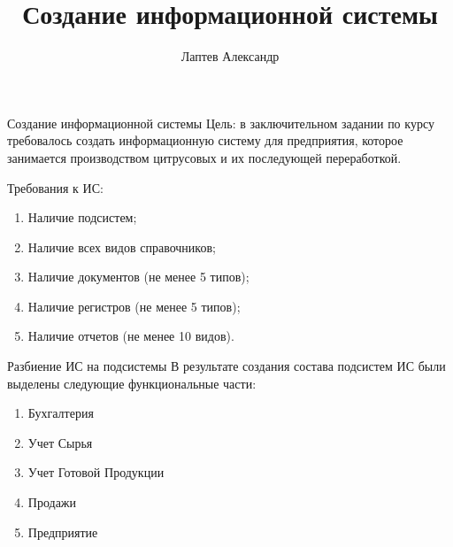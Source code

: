 \documentclass[12pt,a4paper,mathserif]{beamer}
\author{Лаптев Александр}
\title{Создание информационной системы}
\begin{document}
\begin{frame}
\maketitle
\end{frame}

\begin{frame}{Создание информационной системы}
    \setlength{\parindent}{0.5cm}
    Цель: в заключительном задании по курсу требовалось создать информационную систему для предприятия, которое занимается производством цитрусовых и их последующей переработкой.
    
    Требования к ИС:
    \begin{enumerate}
        \item Наличие подсистем;
        
        \item Наличие всех видов справочников;
        
        \item Наличие документов (не менее 5 типов);
        
        \item Наличие регистров (не менее 5 типов);
        
        \item Наличие отчетов (не менее 10 видов).
    \end{enumerate}
\end{frame}

\begin{frame}{Разбиение ИС на подсистемы}
    \setlength{\parindent}{0.5cm}
    В результате создания состава подсистем ИС были выделены следующие функциональные части:
    
    \begin{enumerate}
        \item Бухгалтерия
        
        \item Учет Сырья
        
        \item Учет Готовой Продукции
        
        \item Продажи
        
        \item Предприятие
    \end{enumerate}
\end{frame}
\end{document}
